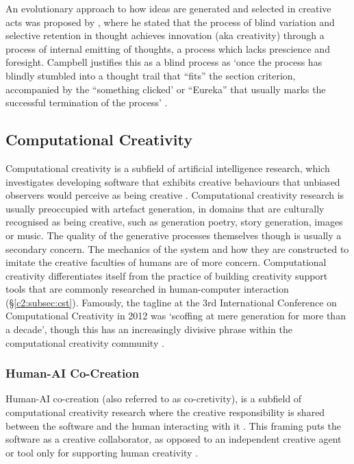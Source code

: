 An evolutionary approach to how ideas are generated and selected in creative acts was proposed by \cite{campbell1960blind}, where he stated that the process of blind variation and selective retention in thought achieves innovation (aka creativity) through a process of internal emitting of thoughts, a process which lacks prescience and foresight. 
Campbell justifies this as a blind process as `once the process has blindly stumbled into a thought trail that ``fits'' the section criterion, accompanied by the ``something clicked' or ``Eureka'' that usually marks the successful termination of the process' \citep{campbell1960blind}.

\subsection{Computational Creativity}

Computational creativity is a subfield of artificial intelligence research, which investigates developing software that exhibits creative behaviours that unbiased observers would perceive as being creative \citep{colton2012computational}.
Computational creativity research is usually preoccupied with artefact generation, in domains that are culturally recognised as being creative, such as generation poetry, story generation, images or music. 
The quality of the generative processes themselves though is usually a secondary concern. 
The mechanics of the system and how they are constructed to imitate the creative faculties of humans are of more concern. 
Computational creativity differentiates itself from the practice of building creativity support tools that are commonly researched in human-computer interaction (\S \ref{c2:subsec:cst}).
Famously, the tagline at the 3rd International Conference on Computational Creativity in 2012 was ‘scoffing at mere generation for more than a decade’, though this has an increasingly divisive phrase within the computational creativity community \citep{ventura2016mere}.

\subsubsection{Human-AI Co-Creation}
\label{c2:subsubsec:co-creativity}

Human-AI co-creation (also referred to as co-cretivity), is a subfield of computational creativity research where the creative responsibility is shared between the software and the human interacting with it \citep{candy2002modeling}.
This framing puts the software as a creative collaborator, as opposed to an independent creative agent or tool only for supporting human creativity \citep{feldman2017co}.


